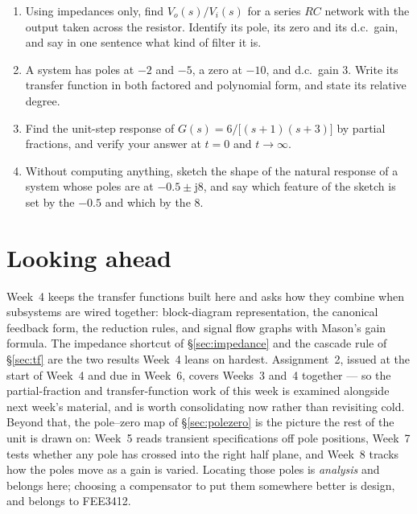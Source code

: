 \documentclass[11pt,a4paper]{article}
\begin{document}
\begin{enumerate}
\item Using impedances only, find $V_o(s)/V_i(s)$ for a series $RC$ network
      with the output taken across the resistor. Identify its pole, its zero
      and its d.c.\ gain, and say in one sentence what kind of filter it is.
\item A system has poles at $-2$ and $-5$, a zero at $-10$, and d.c.\ gain $3$.
      Write its transfer function in both factored and polynomial form, and
      state its relative degree.
\item Find the unit-step response of $G(s)=6/\bigl[(s+1)(s+3)\bigr]$ by partial
      fractions, and verify your answer at $t=0$ and $t\to\infty$.
\item Without computing anything, sketch the shape of the natural response of a
      system whose poles are at $-0.5\pm\mathrm{j}8$, and say which feature of
      the sketch is set by the $-0.5$ and which by the $8$.
\end{enumerate}

\section*{Looking ahead}

Week~4 keeps the transfer functions built here and asks how they combine when
subsystems are wired together: block-diagram representation, the canonical
feedback form, the reduction rules, and signal flow graphs with Mason's gain
formula. The impedance shortcut of \S\ref{sec:impedance} and the cascade rule
of \S\ref{sec:tf} are the two results Week~4 leans on hardest. Assignment~2,
issued at the start of Week~4 and due in Week~6, covers Weeks~3 and~4 together
--- so the partial-fraction and transfer-function work of this week is examined
alongside next week's material, and is worth consolidating now rather than
revisiting cold. Beyond that, the pole--zero map of \S\ref{sec:polezero} is the
picture the rest of the unit is drawn on: Week~5 reads transient specifications
off pole positions, Week~7 tests whether any pole has crossed into the right
half plane, and Week~8 tracks how the poles move as a gain is varied. Locating
those poles is \emph{analysis} and belongs here; choosing a compensator to put
them somewhere better is design, and belongs to FEE3412.
\end{document}
